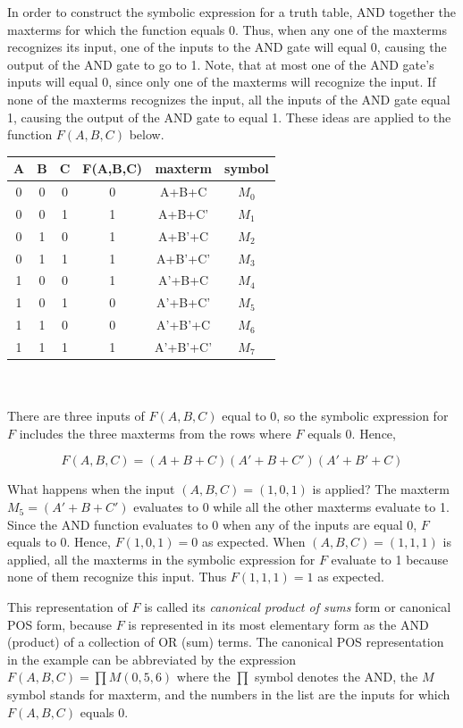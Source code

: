 In order to construct the symbolic expression for a truth table, 
AND together the maxterms for which the function equals 0. Thus, 
when any one of the maxterms recognizes its input, one of the 
inputs to the AND gate will equal 0, causing the output of the 
AND gate to go to 1.  Note, that at most one of the AND gate's 
inputs will equal 0, since only one of the maxterms will recognize 
the input.  If none of the maxterms recognizes the input, all the 
inputs of the AND gate equal 1, causing the output of the 
AND gate to equal 1.  These ideas are applied to 
the function $F(A,B,C)$ below.

\begin{tabular}{c|c|c||c|c|c}
A & B & C & F(A,B,C) & maxterm   & symbol \\ \hline
0 & 0 & 0 & 0        & A+B+C     & $M_0$   \\ \hline
0 & 0 & 1 & 1        & A+B+C'    & $M_1$   \\ \hline
0 & 1 & 0 & 1        & A+B'+C    & $M_2$   \\ \hline
0 & 1 & 1 & 1        & A+B'+C'   & $M_3$   \\ \hline
1 & 0 & 0 & 1        & A'+B+C    & $M_4$   \\ \hline
1 & 0 & 1 & 0        & A'+B+C'   & $M_5$   \\ \hline
1 & 1 & 0 & 0        & A'+B'+C   & $M_6$   \\ \hline
1 & 1 & 1 & 1        & A'+B'+C'  & $M_7$   \\ 
\end{tabular}
\\ \\
There are three inputs of $F(A,B,C)$ equal to 0, so the symbolic
expression for $F$ includes the three maxterms from the rows where
$F$ equals 0.  Hence, 

$$F(A,B,C) =  (A+B+C)(A'+B+C')(A'+B'+C)$$

What happens when the input $(A,B,C)=(1,0,1)$ is applied?  
The maxterm $M_5=(A'+B+C')$ evaluates to 0 while all the other maxterms 
evaluate to 1.  Since the AND function evaluates to 0 when any of 
the inputs are equal 0, $F$ equals to 0. Hence, $F(1,0,1)=0$ as
expected.  When $(A,B,C)=(1,1,1)$ is applied, all the
maxterms in the symbolic expression for $F$ evaluate to 1 because
none of them recognize this input.  Thus $F(1,1,1)=1$ as expected.

This representation of $F$ is called its {\it canonical product of sums} 
form or canonical POS form, because $F$ is represented in its most
elementary form as the AND (product) of a collection of OR (sum) terms.  
The canonical POS representation in the example can be abbreviated by 
the expression $F(A,B,C) = \prod M(0,5,6)$  where the $\prod$
symbol denotes the AND, the $M$ symbol stands for maxterm, and the 
numbers in the list are the inputs for which $F(A,B,C)$ equals 0.

